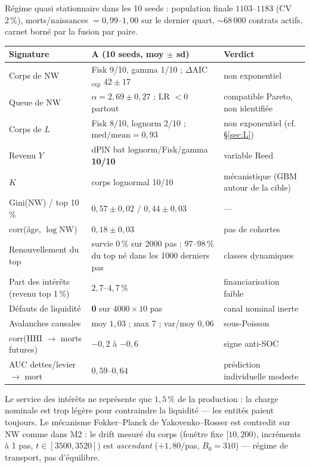 \documentclass[11pt,a4paper]{article}
\newcommand{\NW}{\mathrm{NW}}
\begin{document}
Régime quasi stationnaire dans les 10 seeds : population finale
$1103$--$1183$ (CV $2\,\%$), morts/naissances $= 0{,}99$--$1{,}00$ sur le
dernier quart, $\sim 68\,000$ contrats actifs, carnet borné par la fusion
par paire.

\begin{center}
\small
\setlength{\tabcolsep}{4pt}
\begin{tabularx}{\textwidth}{@{}p{2.8cm}X>{\raggedright\arraybackslash}p{3.0cm}@{}}
\toprule
Signature & A (10 seeds, moy $\pm$ sd) & Verdict \\
\midrule
Corps de $\NW$ & Fisk 9/10, gamma 1/10 ; $\Delta$AIC$_{\exp}$ $42 \pm 17$ &
non exponentiel \\
Queue de $\NW$ & $\alpha = 2{,}69 \pm 0{,}27$ ; LR $< 0$ partout &
compatible Pareto, non identifiée \\
Corps de $L$ & Fisk 8/10, lognorm 2/10 ; $\mathrm{med/mean} = 0{,}93$ &
non exponentiel (cf. §\ref{sec:L}) \\
Revenu $Y$ & dPlN bat lognorm/Fisk/gamma \textbf{10/10} & variable Reed \\
$K$ & corps lognormal 10/10 & mécanistique (GBM autour de la cible) \\
Gini($\NW$) / top 10\,\% & $0{,}57 \pm 0{,}02$ / $0{,}44 \pm 0{,}03$ & --- \\
corr(âge, $\log \NW$) & $0{,}18 \pm 0{,}03$ & pas de cohortes \\
Renouvellement du top & survie 0\,\% sur 2000 pas ; 97--98\,\% du top né
dans les 1000 derniers pas & classes dynamiques \\
Part des intérêts (revenu top 1\,\%) & $2{,}7$--$4{,}7\,\%$ &
financiarisation faible \\
Défauts de liquidité & \textbf{0} sur $4000 \times 10$ pas &
canal nominal inerte \\
Avalanches causales & moy $1{,}03$ ; max 7 ; var/moy $0{,}06$ &
sous-Poisson \\
corr(HHI $\to$ morts futures) & $-0{,}2$ à $-0{,}6$ &
signe anti-SOC \\
AUC dettes/levier $\to$ mort & $0{,}59$--$0{,}64$ &
prédiction individuelle modeste \\
\bottomrule
\end{tabularx}
\end{center}

Le service des intérêts ne représente que $1{,}5\,\%$ de la production : la
charge nominale est trop légère pour contraindre la liquidité — les entités
paient toujours. Le mécanisme Fokker--Planck de Yakovenko--Rosser est
contredit sur $\NW$ comme dans M2 : le drift mesuré du corps (fenêtre fixe
$[10, 200)$, incréments à 1 pas, $t \in [3500, 3520]$) est \emph{ascendant}
($+1{,}80$/pas, $B_0 = 310$) — régime de transport, pas d'équilibre.
\end{document}
